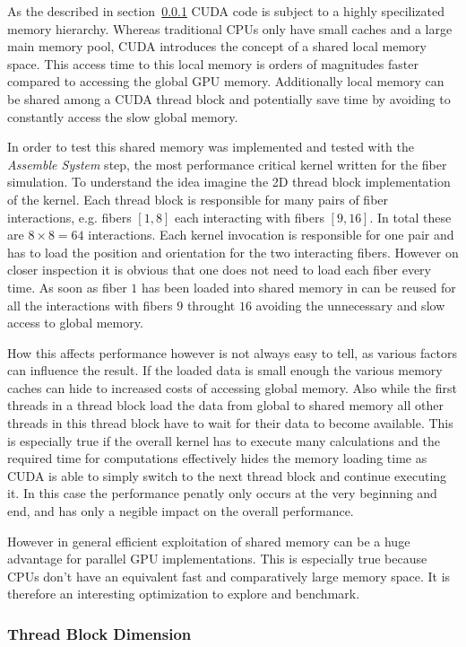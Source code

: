 \documentclass[a4paper,11pt]{kth-mag}
\begin{document}
As the described in section~\ref{} CUDA code is subject to a highly specilizated memory hierarchy. Whereas traditional CPUs only have small caches and a large main memory pool, CUDA introduces the concept of a shared local memory space. This access time to this local memory is orders of magnitudes faster compared to accessing the global GPU memory. Additionally local memory can be shared among a CUDA thread block and potentially save time by avoiding to constantly access the slow global memory.

In order to test this shared memory was implemented and tested with the \emph{Assemble System} step, the most performance critical kernel written for the fiber simulation. To understand the idea imagine the 2D thread block implementation of the kernel. Each thread block is responsible for many pairs of fiber interactions, e.g. fibers $[1,8]$ each interacting with fibers $[9,16]$. In total these are $8 \times 8 = 64$ interactions. Each kernel invocation is responsible for one pair and has to load the position and orientation for the two interacting fibers. However on closer inspection it is obvious that one does not need to load each fiber every time. As soon as fiber $1$ has been loaded into shared memory in can be reused for all the interactions with fibers $9$ throught $16$ avoiding the unnecessary and slow access to global memory.

How this affects performance however is not always easy to tell, as various factors can influence the result. If the loaded data is small enough the various memory caches can hide to increased costs of accessing global memory. Also while the first threads in a thread block load the data from global to shared memory all other threads in this thread block have to wait for their data to become available. This is especially true if the overall kernel has to execute many calculations and the required time for computations effectively hides the memory loading time as CUDA is able to simply switch to the next thread block and continue executing it. In this case the performance penatly only occurs at the very beginning and end, and has only a negible impact on the overall performance.

However in general efficient exploitation of shared memory can be a huge advantage for parallel GPU implementations. This is especially true because CPUs don't have an equivalent fast and comparatively large memory space. It is therefore an interesting optimization to explore and benchmark.

\subsubsection{Thread Block Dimension}
\end{document}
